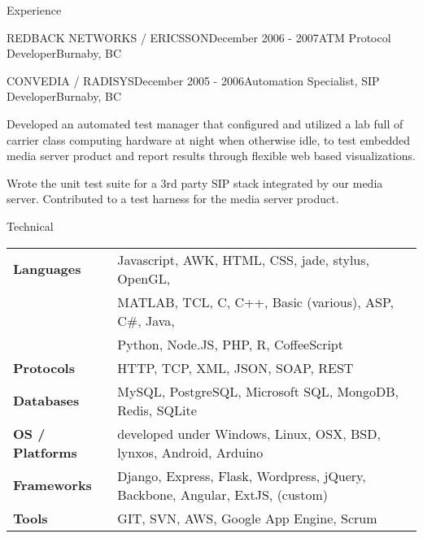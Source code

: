 \documentclass{resume} %
\begin{document}
\begin{rSection}{Experience}
\begin{rSubsection}{REDBACK NETWORKS / ERICSSON}{December 2006 - 2007}{ATM Protocol Developer}{Burnaby, BC}
\end{rSubsection}
\begin{rSubsection}{CONVEDIA / RADISYS}{December 2005 - 2006}{Automation Specialist, SIP Developer}{Burnaby, BC}
\item Developed an automated test manager that configured and utilized a lab full of carrier class computing hardware at night when otherwise idle, to test embedded media server product and report results through flexible web based visualizations.
\item Wrote the unit test suite for a 3rd party SIP stack integrated by our media server. Contributed to a test harness for the media server product.
\end{rSubsection}

\end{rSection}


\begin{rSection}{Technical}
\begin{tabular}{ @{} >{\bfseries}l @{\hspace{6ex}} l }
Languages & Javascript, AWK, HTML, CSS, jade, stylus, OpenGL, \\
 & MATLAB, TCL, C, C++, Basic (various), ASP, C\#, Java, \\
 & Python, Node.JS, PHP, R, CoffeeScript \\
Protocols & HTTP, TCP, XML, JSON, SOAP, REST \\
Databases & MySQL, PostgreSQL, Microsoft SQL, MongoDB, Redis, SQLite \\
OS / Platforms & developed under Windows, Linux, OSX, BSD, lynxos, Android, Arduino \\
Frameworks & Django, Express, Flask, Wordpress, jQuery, Backbone, Angular, ExtJS, (custom) \\
Tools & GIT, SVN, AWS, Google App Engine, Scrum \\
\end{tabular}
\end{rSection}

\end{document}
